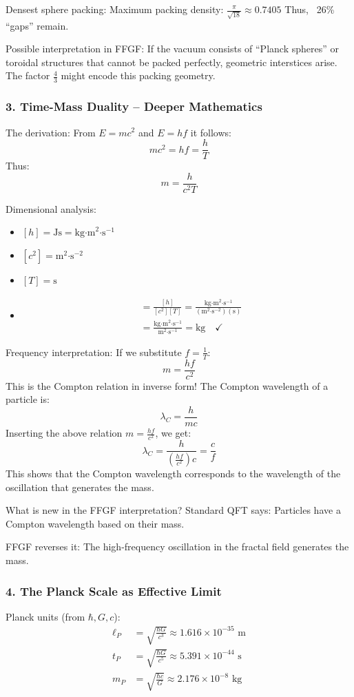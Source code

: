 	Densest sphere packing:
	Maximum packing density: \( \frac{\pi}{\sqrt{18}} \approx 0.7405 \)
	Thus, ~26\% ``gaps'' remain.
	
	Possible interpretation in FFGF:
	If the vacuum consists of ``Planck spheres'' or toroidal structures that cannot be packed perfectly, geometric interstices arise. The factor \( \frac{4}{3} \) might encode this packing geometry.
	
	\subsubsection{3. Time-Mass Duality – Deeper Mathematics}
	The derivation:
	From \( E = mc^2 \) and \( E = hf \) it follows:
	\[
	mc^2 = hf = \frac{h}{T}
	\]
	Thus:
	\[
	m = \frac{h}{c^2 T}
	\]
	
	Dimensional analysis:
	\begin{itemize}
		\item \( [h] = \text{Js} = \text{kg·m}^2\text{·s}^{-1} \)
		\item \( [c^2] = \text{m}^2\text{·s}^{-2} \)
		\item \( [T] = \text{s} \)
		\item \begin{align}
			[m] &= \frac{[h]}{[c^2][T]} = \frac{\text{kg·m}^2\text{·s}^{-1}}{(\text{m}^2\text{·s}^{-2})(\text{s})} \\
			&= \frac{\text{kg·m}^2\text{·s}^{-1}}{\text{m}^2\text{·s}^{-1}} = \text{kg} \quad \checkmark
		\end{align}
	\end{itemize}
	
	Frequency interpretation:
	If we substitute \( f = \frac{1}{T} \):
	\[
	m = \frac{hf}{c^2}
	\]
	This is the Compton relation in inverse form! The Compton wavelength of a particle is:
	\[
	\lambda_C = \frac{h}{mc}
	\]
	Inserting the above relation \( m = \frac{hf}{c^2} \), we get:
	\[
	\lambda_C = \frac{h}{\left(\frac{hf}{c^2}\right)c} = \frac{c}{f}
	\]
	This shows that the Compton wavelength corresponds to the wavelength of the oscillation that generates the mass.
	
	What is new in the FFGF interpretation?
	Standard QFT says: Particles have a Compton wavelength based on their mass.
	
	FFGF reverses it: The high-frequency oscillation in the fractal field generates the mass.
	
	\subsubsection{4. The Planck Scale as Effective Limit}
	Planck units (from \( \hbar, G, c \)):
	\begin{align}
		\ell_P &= \sqrt{\frac{\hbar G}{c^3}} \approx 1.616 \times 10^{-35} \text{ m} \\
		t_P &= \sqrt{\frac{\hbar G}{c^5}} \approx 5.391 \times 10^{-44} \text{ s} \\
		m_P &= \sqrt{\frac{\hbar c}{G}} \approx 2.176 \times 10^{-8} \text{ kg}
	\end{align}
	
